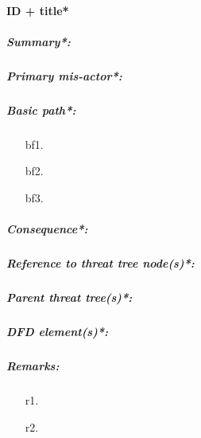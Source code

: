 

\paragraph{ID + title*}
    \subparagraph{Summary*:}
    \subparagraph{Primary mis-actor*:}
    \subparagraph{Basic path*:}
    \begin{enumerate}
        \item[bf1.]{}
        \item[bf2.]{}
        \item[bf3.]{}
    \end{enumerate}
    \subparagraph{Consequence*:}


    \subparagraph{Reference to threat tree node(s)*:}
    \subparagraph{Parent threat tree(s)*:}
    \subparagraph{DFD element(s)*:}
    \subparagraph{Remarks:}
    \begin{enumerate}
        \item[r1.]
        \item[r2.]
    \end{enumerate}



